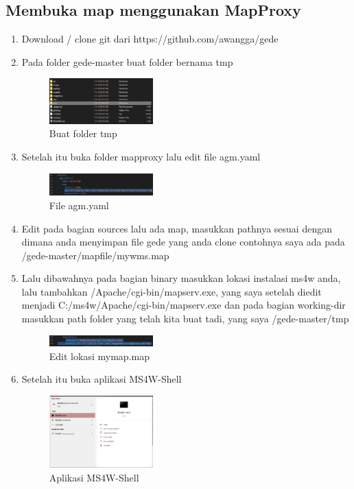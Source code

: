 \subsection{Membuka map menggunakan MapProxy}
\begin{enumerate}
  \item Download / clone git dari https://github.com/awangga/gede	
  \item Pada folder gede-master buat folder bernama tmp
  \hfill\break
  \begin{figure}[H]
  \includegraphics[width=4cm]{figures/Tugas4/1174083/pic13.png}
  \centering
  \caption{Buat folder tmp}
  \end{figure}

  \item Setelah itu buka folder mapproxy lalu edit file agm.yaml
  \hfill\break
  \begin{figure}[H]
  \includegraphics[width=4cm]{figures/Tugas4/1174083/pic14.png}
  \centering
  \caption{File agm.yaml}
  \end{figure}

  \item Edit pada bagian sources lalu ada map, masukkan pathnya sesuai dengan dimana anda menyimpan file gede yang anda clone contohnya saya ada pada /gede-master/mapfile/mywms.map
  \item Lalu dibawahnya pada bagian binary masukkan lokasi instalasi ms4w anda, lalu tambahkan /Apache/cgi-bin/mapserv.exe, yang saya setelah diedit menjadi C:/ms4w/Apache/cgi-bin/mapserv.exe dan pada bagian working-dir masukkan path folder yang telah kita buat tadi, yang saya /gede-master/tmp
  \hfill\break
  \begin{figure}[H]
  \includegraphics[width=4cm]{figures/Tugas4/1174083/pic15.png}
  \centering
  \caption{Edit lokasi mymap.map}
  \end{figure}

  \item Setelah itu buka aplikasi MS4W-Shell
  \hfill\break
  \begin{figure}[H]
  \includegraphics[width=4cm]{figures/Tugas4/1174083/pic16.png}
  \centering
  \caption{Aplikasi MS4W-Shell}
  \end{figure}


\end{enumerate}
